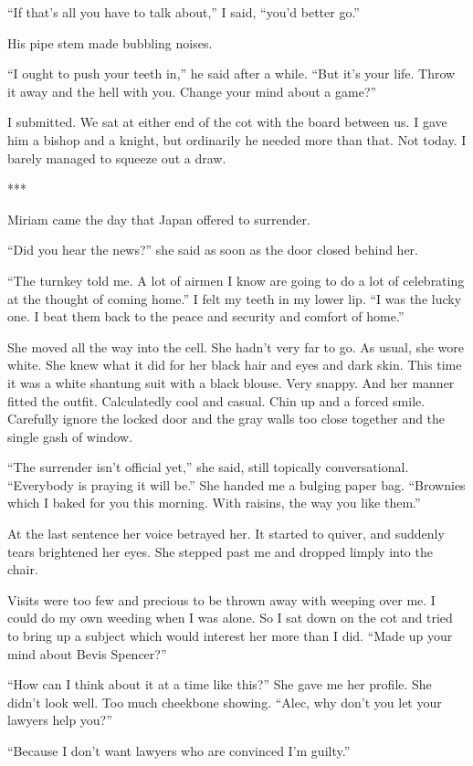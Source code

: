 \documentclass{novel}
\begin{document}
{“If that’s all you have to talk about,” I said, “you’d better go.”

His pipe stem made bubbling noises.

“I ought to push your teeth in,” he said after a while. “But it’s your life. Throw it away and the hell with you. Change your mind about a game?”

I submitted. We sat at either end of the cot with the board between us. I gave him a bishop and a knight, but ordinarily he needed more than that. Not today. I barely managed to squeeze out a draw.

***

Miriam came the day that Japan offered to surrender.

“Did you hear the news?” she said as soon as the door closed behind her.

“The turnkey told me. A lot of airmen I know are going to do a lot of celebrating at the thought of coming home.” I felt my teeth in my lower lip. “I was the lucky one. I beat them back to the peace and security and comfort of home.”

She moved all the way into the cell. She hadn’t very far to go. As usual, she wore white. She knew what it did for her black hair and eyes and dark skin. This time it was a white shantung suit with a black blouse. Very snappy. And her manner fitted the outfit. Calculatedly cool and casual. Chin up and a forced smile. Carefully ignore the locked door and the gray walls too close together and the single gash of window.

“The surrender isn’t official yet,” she said, still topically conversational. “Everybody is praying it will be.” She handed me a bulging paper bag. “Brownies which I baked for you this morning. With raisins, the way you like them.”

At the last sentence her voice betrayed her. It started to quiver, and suddenly tears brightened her eyes. She stepped past me and dropped limply into the chair.

Visits were too few and precious to be thrown away with weeping over me. I could do my own weeding when I was alone. So I sat down on the cot and tried to bring up a subject which would interest her more than I did. “Made up your mind about Bevis Spencer?”

“How can I think about it at a time like this?” She gave me her profile. She didn’t look well. Too much cheekbone showing. “Alec, why don’t you let your lawyers help you?”

“Because I don’t want lawyers who are convinced I’m guilty.”

}
\end{document}
